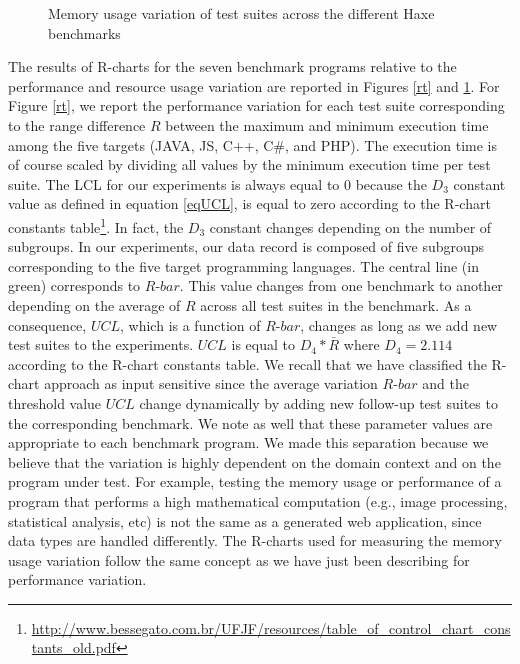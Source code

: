 \begin{figure}
	\caption{Memory usage variation of test suites across the different Haxe benchmarks}
	\label{rm}
\end{figure}
The results of R-charts for the seven benchmark programs relative to the performance and resource usage variation are reported in Figures \ref{rt} and \ref{rm}. For Figure \ref{rt}, we report the performance variation for each test suite corresponding to the range difference $R$ between the maximum and minimum execution time among the five targets (JAVA, JS, C++, C\#, and PHP). 
The execution time is of course scaled by dividing all values by the minimum execution time per test suite. 
The LCL for our experiments is always equal to 0 because the $D_{3}$ constant value as defined in equation \ref{eqUCL}, is equal to zero according to the R-chart constants table\footnote{\url{http://www.bessegato.com.br/UFJF/resources/table_of_control_chart_constants_old.pdf}}. In fact, the $D_{3}$ constant changes depending on the number of subgroups. In our experiments, our data record is composed of five subgroups corresponding to the five target programming languages.
The central line (in green) corresponds to $R$-$bar$. This value changes from one benchmark to another depending on the average of $R$ across all test suites in the benchmark. As a consequence, $UCL$, which is a function of $R$-$bar$, changes as long as we add new test suites to the experiments. $UCL$ is equal to $D_{4}*\bar{R}$ where $D_{4}=2.114$ according to the R-chart constants table. We recall that we have classified the R-chart approach as input sensitive since the average variation $R$-$bar$ and the threshold value $UCL$ change dynamically by adding new follow-up test suites to the corresponding benchmark. 
We note as well that these parameter values are appropriate to each benchmark program. We made this separation because we believe that the variation is highly dependent on the domain context and on the program under test. For example, testing the memory usage or performance of a program that performs a high mathematical computation (e.g., image processing, statistical analysis, etc) is not the same as a generated web application, since data types are handled differently. The R-charts used for measuring the memory usage variation follow the same concept as we have just been describing for performance variation.  

